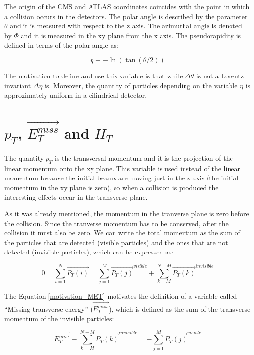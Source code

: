 The origin of the CMS and ATLAS coordinates coincides with the point in which a collision occurs in the detectors. 
The polar angle is described by the parameter $\theta$ and it is measured with respect to the z axis.
The azimuthal angle is denoted by $\Phi$ and it is measured in the xy plane from the x axis. The pseudorapidity is defined in terms of the polar angle as:

\begin{equation}
 \eta \equiv - \ln \left( \tan (\theta /2 ) \right)
\end{equation}

 The motivation to define and use this variable is that while $\Delta \theta$ is not a Lorentz invariant $\Delta \eta$ is. Moreover, the quantity of particles depending on the variable $\eta$
 is approximately uniform in a cilindrical detector. 
 
  
 \section{$p_T$, $\vec{E_T^{miss}}$ and $H_T$}

 The quantity $p_T$ is the transversal momentum and it is the projection of the linear momentum onto the xy plane. This variable is used instead of the linear momentum because the initial beams
 are moving just in the z axis (the initial momentum in the xy plane is zero), so when a collision is produced the interesting effects occur in the transverse plane.
 
 As it was already mentioned, the momentum in the tranverse plane is zero before the collision. Since the tranverse momentum has to be conserved, after the collision it must also be zero. We can write
 the total momentum as the sum of the particles that are detected (visible particles) and the ones that are not detected (invisible particles), which can be expressed as:
 
 \begin{equation}
  0 = \sum_{i=1}^N \vec{P_T(i)} = \sum_{j=1}^M \vec{P_T(j)}^{visible} + \sum_{k=M}^{N-M} \vec{P_T(k)}^{invisible}
  \label{motivation_MET}
 \end{equation}

 The Equation \ref{motivation_MET} motivates the definition of a variable called ``Missing transverse energy'' ($\vec{E_T^{miss}}$), which is defined as the sum of the transverse momentum of the invisible
 particles:
 
 \begin{equation}
  \vec{E_T^{miss}} \equiv \sum_{k=M}^{N-M}\vec{P_T(k)}^{invisible} = - \sum_{j=1}^M  \vec{P_T(j)}^{visible}
 \end{equation}

